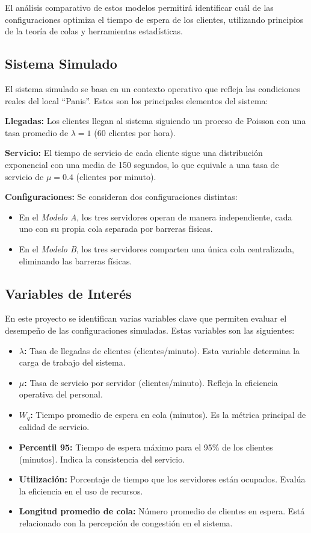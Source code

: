 \documentclass[a4paper,12pt]{article}
\begin{document}
El análisis comparativo de estos modelos permitirá identificar cuál de las configuraciones optimiza el tiempo de espera de los clientes, utilizando principios de la teoría de colas y herramientas estadísticas.

\subsection{Sistema Simulado}

El sistema simulado se basa en un contexto operativo que refleja las condiciones reales del local “Panis”. Estos son los principales elementos del sistema:

\textbf{Llegadas:} Los clientes llegan al sistema siguiendo un proceso de Poisson con una tasa promedio de $\lambda = 1$ (60 clientes por hora).

\textbf{Servicio:} El tiempo de servicio de cada cliente sigue una distribución exponencial con una media de 150 segundos, lo que equivale a una tasa de servicio de $\mu = 0.4$ (clientes por minuto).

\textbf{Configuraciones:} Se consideran dos configuraciones distintas:
\begin{itemize}
    \item En el \textit{Modelo A}, los tres servidores operan de manera independiente, cada uno con su propia cola separada por barreras físicas.
    \item En el \textit{Modelo B}, los tres servidores comparten una única cola centralizada, eliminando las barreras físicas.
\end{itemize}

\subsection{Variables de Interés}

En este proyecto se identifican varias variables clave que permiten evaluar el desempeño de las configuraciones simuladas. Estas variables son las siguientes:

\begin{itemize}
    \item \textbf{$\lambda$:} Tasa de llegadas de clientes (clientes/minuto). Esta variable determina la carga de trabajo del sistema.
    \item \textbf{$\mu$:} Tasa de servicio por servidor (clientes/minuto). Refleja la eficiencia operativa del personal.
    \item \textbf{$W_q$:} Tiempo promedio de espera en cola (minutos). Es la métrica principal de calidad de servicio.
    \item \textbf{Percentil 95:} Tiempo de espera máximo para el 95\% de los clientes (minutos). Indica la consistencia del servicio.
    \item \textbf{Utilización:} Porcentaje de tiempo que los servidores están ocupados. Evalúa la eficiencia en el uso de recursos.
    \item \textbf{Longitud promedio de cola:} Número promedio de clientes en espera. Está relacionado con la percepción de congestión en el sistema.
\end{itemize}
\end{document}
